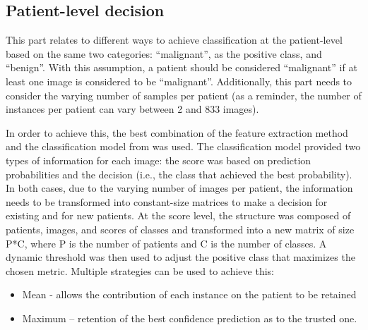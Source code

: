 \documentclass[journal,article,accept,moreauthors,pdftex, applsci]{Definitions/mdpi}
\begin{document}
\subsection{Patient-level decision}
\label{sec:patient_decision}
This part relates to different ways to achieve classification at the patient-level based on the same two categories: “malignant”, as the positive class, and “benign”. With this assumption, a patient should be considered “malignant” if at least one image is considered to be “malignant”. Additionally, this part needs to consider the varying number of samples per patient (as a reminder, the number of instances per patient can vary between 2 and 833 images).\par
In order to achieve this, the best combination of the feature extraction method and the classification model from  was used. The classification model provided two types of information for each image: the score was based on prediction probabilities and the decision (i.e., the class that achieved the best probability). In both cases, due to the varying number of images per patient, the information needs to be transformed into constant-size matrices to make a decision for existing and for new patients. At the score level, the structure was composed of patients, images, and scores of classes and transformed into a new matrix of size P*C, where P is the number of patients and C is the number of classes. A dynamic threshold was then used to adjust the positive class that maximizes the chosen metric. Multiple strategies can be used to achieve this:
\begin{itemize}
\item Mean - allows the contribution of each instance on the patient to be retained
\item Maximum – retention of the best confidence prediction as to the trusted one.
\end{itemize}
\end{document}
